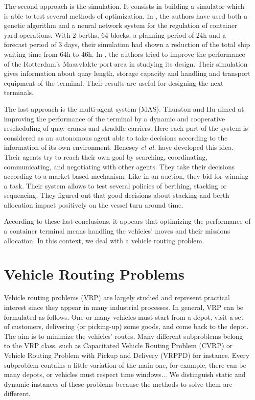 \documentclass[journal]{IEEEtran}
\begin{document}
The second approach is the simulation. It consists in building a simulator which
is able to test several methods of optimization. In \cite{jin2004}, the authors have used both a genetic algorithm and a neural network system for the regulation of container yard operations. With 2 berths, 64
blocks, a planning period of 24h and a forecast period of 3 days, their simulation had shown a reduction of the total ship waiting time from 64h to 46h.
In \cite{ottjes2006}, the authors tried to improve the performance of the Rotterdam's Maasvlakte port area in studying its design. Their simulation gives information about quay length, storage capacity and
handling and transport equipment of the terminal. Their results are useful for
designing the next terminals.

The last approach is the multi-agent system (MAS). Thurston and Hu \cite{thurston2002} aimed at improving the performance of the terminal by a dynamic and cooperative rescheduling of quay cranes and straddle carriers. Here
each part of the system is considered as an autonomous agent able to take decisions according to the information of its own environment. Henesey \textit{et al.} \cite{Henesey2002-1,Henesey2002-2,Henesey2003,Henesey2004}
have developed this idea. Their agents try to reach their own goal by searching, coordinating, communicating, and negotiating with other agents. They take their decisions according to a market based mechanism. Like in an
auction, they bid for winning a task. Their system allows to test several policies of berthing, stacking or sequencing. They figured out that good decisions about stacking and berth allocation impact positively on the vessel turn around time.

According to these last conclusions, it appears that optimizing the performance
of a container terminal means handling the vehicles' moves and their missions
allocation. In this context, we deal with a vehicle routing problem.

\section{Vehicle Routing Problems}
 
Vehicle routing problems (VRP) are largely studied and represent practical interest since they appear in many industrial processes. In general, VRP can be formulated as follows. One or many vehicles must start from a depot, visit a set of customers, delivering (or picking-up) some goods, and come back to the depot. The aim is to minimize the vehicles' routes. Many
different subproblems belong to the VRP class, such as Capacitated Vehicle
Routing Problem (CVRP) or Vehicle Routing Problem with Pickup and Delivery
(VRPPD) for instance. Every subproblem contains a little variation of the main
one, for example, there can be many depots, or vehicles must respect time
windows... We distinguish static and dynamic instances of these problems because the methods to solve them are different.
\end{document}
